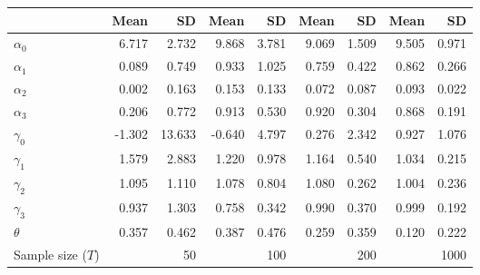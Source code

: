 
\begin{tabular}[t]{lrrrrrrrr}
\toprule
  & Mean & SD & Mean  & SD  & Mean   & SD   & Mean    & SD   \\
\midrule
$\alpha_{0}$ & 6.717 & 2.732 & 9.868 & 3.781 & 9.069 & 1.509 & 9.505 & 0.971\\
$\alpha_{1}$ & 0.089 & 0.749 & 0.933 & 1.025 & 0.759 & 0.422 & 0.862 & 0.266\\
$\alpha_{2}$ & 0.002 & 0.163 & 0.153 & 0.133 & 0.072 & 0.087 & 0.093 & 0.022\\
$\alpha_{3}$ & 0.206 & 0.772 & 0.913 & 0.530 & 0.920 & 0.304 & 0.868 & 0.191\\
$\gamma_{0}$ & -1.302 & 13.633 & -0.640 & 4.797 & 0.276 & 2.342 & 0.927 & 1.076\\
$\gamma_{1}$ & 1.579 & 2.883 & 1.220 & 0.978 & 1.164 & 0.540 & 1.034 & 0.215\\
$\gamma_{2}$ & 1.095 & 1.110 & 1.078 & 0.804 & 1.080 & 0.262 & 1.004 & 0.236\\
$\gamma_{3}$ & 0.937 & 1.303 & 0.758 & 0.342 & 0.990 & 0.370 & 0.999 & 0.192\\
$\theta$ & 0.357 & 0.462 & 0.387 & 0.476 & 0.259 & 0.359 & 0.120 & 0.222\\
Sample size ($T$) &  & 50 &  & 100 &  & 200 &  & 1000\\
\bottomrule
\end{tabular}
